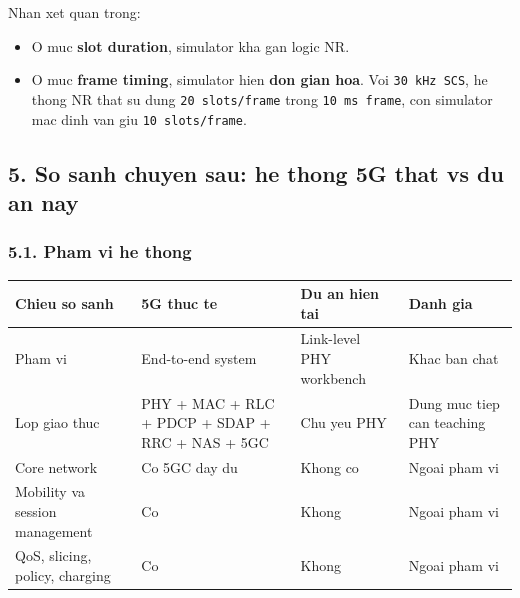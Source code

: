 \documentclass[
  vietnamese,
  a4paper,
  11pt]{article}
\newcounter{none} %
\providecommand{\tightlist}{%
  \setlength{\itemsep}{0pt}\setlength{\parskip}{0pt}}
\begin{document}
Nhan xet quan trong:

\begin{itemize}
\tightlist
\item
  O muc \textbf{slot duration}, simulator kha gan logic NR.
\item
  O muc \textbf{frame timing}, simulator hien \textbf{don gian hoa}. Voi
  \texttt{30\ kHz\ SCS}, he thong NR that su dung
  \texttt{20\ slots/frame} trong \texttt{10\ ms\ frame}, con simulator
  mac dinh van giu \texttt{10\ slots/frame}.
\end{itemize}

\subsection{5. So sanh chuyen sau: he thong 5G that vs du an
nay}\label{so-sanh-chuyen-sau-he-thong-5g-that-vs-du-an-nay}

\subsubsection{5.1. Pham vi he thong}\label{pham-vi-he-thong}

{\def\LTcaptype{none} %
\begin{longtable}[]{@{}
  >{\raggedright\arraybackslash}p{}
  >{\raggedright\arraybackslash}p{}
  >{\raggedright\arraybackslash}p{}
  >{\raggedright\arraybackslash}p{}@{}}
\toprule\noalign{}
\begin{minipage}[b]{\linewidth}\raggedright
Chieu so sanh
\end{minipage} & \begin{minipage}[b]{\linewidth}\raggedright
5G thuc te
\end{minipage} & \begin{minipage}[b]{\linewidth}\raggedright
Du an hien tai
\end{minipage} & \begin{minipage}[b]{\linewidth}\raggedright
Danh gia
\end{minipage} \\
\midrule\noalign{}
\endhead
\bottomrule\noalign{}
\endlastfoot
Pham vi & End-to-end system & Link-level PHY workbench & Khac ban
chat \\
Lop giao thuc & PHY + MAC + RLC + PDCP + SDAP + RRC + NAS + 5GC & Chu
yeu PHY & Dung muc tiep can teaching PHY \\
Core network & Co 5GC day du & Khong co & Ngoai pham vi \\
Mobility va session management & Co & Khong & Ngoai pham vi \\
QoS, slicing, policy, charging & Co & Khong & Ngoai pham vi \\
\end{longtable}
}
\end{document}

